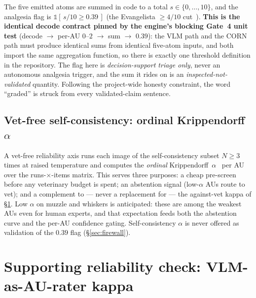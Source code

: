 The five emitted atoms are summed in code to a total $s\in\{0,\dots,10\}$, and
the analgesia flag is $\mathbb{1}[\,s/10 \geq 0.39\,]$ (the Evangelista
$\geq 4/10$ cut~\cite{evangelista2019}). \textbf{This is the identical decode
contract pinned by the engine's blocking Gate~4 unit test}
(decode $\to$ per-AU $0$--$2$ $\to$ sum $\to$ $0.39$): the VLM path and the CORN
path must produce identical sums from identical five-atom inputs, and both
import the same aggregation function, so there is exactly one threshold
definition in the repository. The flag here is \emph{decision-support triage
only}, never an autonomous analgesia trigger, and the sum it rides on is an
\emph{inspected-not-validated} quantity. Following the project-wide honesty
constraint, the word ``graded'' is struck from every validated-claim sentence.

\subsection{Vet-free self-consistency: ordinal Krippendorff $\alpha$}
\label{sec:vlm-consistency}

A vet-free reliability axis runs each image of the self-consistency subset
$N\geq 3$ times at raised temperature and computes the \emph{ordinal}
Krippendorff~$\alpha$~\cite{krippendorff2004} per AU over the
runs-$\times$-items matrix. This serves three purposes: a cheap pre-screen
before any veterinary budget is spent; an abstention signal (low-$\alpha$ AUs
route to vet); and a complement to --- never a replacement for --- the
against-vet kappa of \S\ref{sec:vlm-au-rater-kappa}. Low $\alpha$ on muzzle and
whiskers is anticipated: these are among the weakest AUs even for human experts,
and that expectation feeds both the abstention curve and the per-AU confidence
gating. Self-consistency $\alpha$ is never offered as validation of the $0.39$
flag (\S\ref{sec:firewall}).

\section{Supporting reliability check: VLM-as-AU-rater kappa}
\label{sec:vlm-au-rater-kappa}

